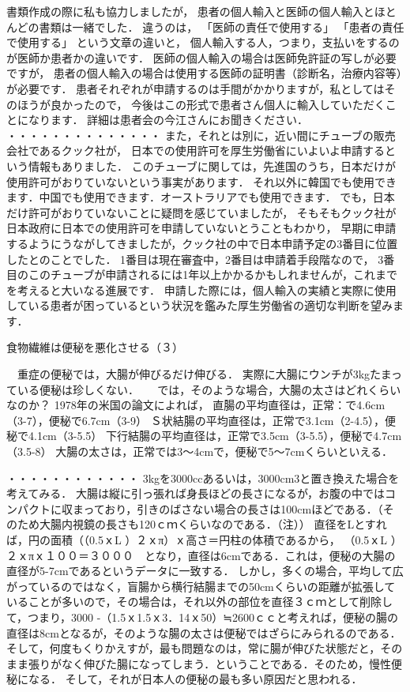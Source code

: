 書類作成の際に私も協力しましたが，
患者の個人輸入と医師の個人輸入とほとんどの書類は一緒でした．
違うのは，
「医師の責任で使用する」
「患者の責任で使用する」
という文章の違いと，
個人輸入する人，つまり，支払いをするのが医師か患者かの違いです．
医師の個人輸入の場合は医師免許証の写しが必要ですが，
患者の個人輸入の場合は使用する医師の証明書（診断名，治療内容等）が必要です．
患者それぞれが申請するのは手間がかかりますが，私としてはそのほうが良かったので，
今後はこの形式で患者さん個人に輸入していただくことになります．
詳細は患者会の今江さんにお聞きください．
・・・・・・・・・・・・・・
また，それとは別に，近い間にチューブの販売会社であるクック社が，
日本での使用許可を厚生労働省にいよいよ申請するという情報もありました．
このチューブに関しては，先進国のうち，日本だけが使用許可がおりていないという事実があります．
それ以外に韓国でも使用できます．中国でも使用できます．オーストラリアでも使用できます．
でも，日本だけ許可がおりていないことに疑問を感じていましたが，
そもそもクック社が日本政府に日本での使用許可を申請していないとうこともわかり，
早期に申請するようにうながしてきましたが，クック社の中で日本申請予定の3番目に位置したとのことでした．
1番目は現在審査中，2番目は申請着手段階なので，
3番目のこのチューブが申請されるには1年以上かかるかもしれませんが，これまでを考えると大いなる進展です．
申請した際には，個人輸入の実績と実際に使用している患者が困っているという状況を鑑みた厚生労働省の適切な判断を望みます．



食物繊維は便秘を悪化させる（３）

　重症の便秘では，大腸が伸びるだけ伸びる．
実際に大腸にウンチが3kgたまっている便秘は珍しくない． 
　 
では，そのような場合，大腸の太さはどれくらいなのか？
1978年の米国の論文によれば，
直腸の平均直径は，正常：で4.6cm（3-7），便秘で6.7cm（3-9）
Ｓ状結腸の平均直径は，正常で3.1cm（2-4.5），便秘で4.1cm（3-5.5）
下行結腸の平均直径は，正常で3.5cm（3-5.5），便秘で4.7cm（3.5-8）
大腸の太さは，正常では3～4cmで，便秘で5～7cmくらいといえる．

・・・・・・・・・・・・
3kgを3000ccあるいは，3000cm3と置き換えた場合を考えてみる．
大腸は縦に引っ張れば身長ほどの長さになるが，お腹の中ではコンパクトに収まっており，引きのばさない場合の長さは100cmほどである．（そのため大腸内視鏡の長さも120ｃｍくらいなのである．（注））
直径をLとすれば，円の面積（（0.5ｘL ）２ｘπ）ｘ高さ＝円柱の体積であるから，
（0.5ｘL ）２ｘπｘ１００＝３０００　となり，直径は6cmである．これは，便秘の大腸の直径が5-7cmであるというデータに一致する．
しかし，多くの場合，平均して広がっているのではなく，盲腸から横行結腸までの50cmくらいの距離が拡張していることが多いので，その場合は，それ以外の部位を直径３ｃｍとして削除して，つまり，3000 -（1.5ｘ1.5ｘ3．14ｘ50）≒2600ｃｃと考えれば，便秘の腸の直径は8cmとなるが，そのような腸の太さは便秘ではざらにみられるのである．
そして，何度もくりかえすが，最も問題なのは，常に腸が伸びた状態だと，そのまま張りがなく伸びた腸になってしまう．ということである．そのため，慢性便秘になる．
そして，それが日本人の便秘の最も多い原因だと思われる．

